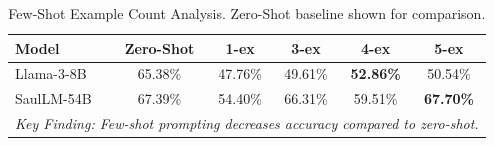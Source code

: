 \begin{table}[t]
\centering
\caption{Few-Shot Example Count Analysis. Zero-Shot baseline shown for comparison.}
\label{tab:fewshot}
\small
\begin{tabular}{l|c|cccc}
\toprule
\textbf{Model} & \textbf{Zero-Shot} & \textbf{1-ex} & \textbf{3-ex} & \textbf{4-ex} & \textbf{5-ex} \\
\midrule
Llama-3-8B & 65.38\% & 47.76\% & 49.61\% & \textbf{52.86\%} & 50.54\% \\
SaulLM-54B & 67.39\% & 54.40\% & 66.31\% & 59.51\% & \textbf{67.70\%} \\
\midrule
\multicolumn{6}{l}{\textit{Key Finding: Few-shot prompting decreases accuracy compared to zero-shot.}} \\
\bottomrule
\end{tabular}
\end{table}
